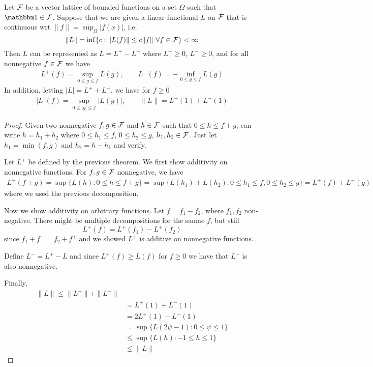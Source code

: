 \begin{theorem}
  Let $\mathcal{F}$ be a vector lattice of bounded functions on a set $\Omega$
  such that $\ind \in \cF$.
  Suppose that we are given a linear functional $L$ on $\mathcal{F}$ that is continuous
  wrt $\|f\| = \sup_{\Omega} \lvert f(x) \rvert$, i.e.
  \[
    \|L\| = \inf \{ c : \|L(f)\| \leq c \|f\|~\forall f \in \mathcal{F} \} < \infty
  \]
  Then $L$ can be represented as $L = L^+ - L^-$ where
  $L^+ \geq 0$, $L^- \geq 0$, and for all nonnegative $f \in \mathcal{F}$ we have
  \begin{align*}
    L^+(f) = \sup_{0 \leq g \leq f} L(g),\qquad
    L^-(f) = -\inf_{0 \leq g \leq f} L(g)
  \end{align*}
  In addition, letting $\lvert L \rvert = L^+ + L^-$, we have for $f \geq 0$
  \begin{align*}
    \lvert L \rvert(f) = \sup_{0 \leq \lvert g \rvert \leq f} \lvert L (g) \rvert,
    \qquad \|L\| = L^+(1) + L^-(1)
  \end{align*}
\end{theorem}

\begin{proof}
  Given two nonnegative $f,g \in \mathcal{F}$ and $h \in \mathcal{F}$ such that
  $0 \leq h \leq f + g$, can write $h = h_1 + h_2$ where
  $0 \leq h_1 \leq f$, $0 \leq h_2 \leq g$, $h_1, h_2 \in \mathcal{F}$.
  Just let $h_1 = \min(f,g)$ and $h_2 = h - h_1$ and verify.

  Let $L^+$ be defined by the previous theorem. We first
  show additivity on nonnegative functions.
  For $f,g \in \mathcal{F}$ nonnegative, we have
  \begin{align*}
    L^+(f+g) = \sup \{L(h) : 0 \leq h \leq f + g\}
    = \sup\{ L(h_1) + L(h_2) : 0 \leq h_1 \leq f, 0 \leq h_2 \leq g\}
    = L^+(f) + L^+(g)
  \end{align*}
  where we used the previous decomposition.

  Now we show additivity on arbitrary functions.
  Let $f = f_1 - f_2$, where $f_1, f_2$ non-negative. There might be
  multiple decompositions for the samae $f$, but still
  \[
    L^+(f) = L^+(f_1) - L^+(f_2)
  \]
  since $f_1 + f^- = f_2 + f^+$ and we showed $L^+$ is additive on nonnegative
  functions.

  Define $L^- =  L^+ - L$ and since $L^+(f) \geq L(f)$ for $f \geq 0$
  we have that $L^-$ is also nonnegative.

  Finally,
  \begin{align*}
    \|L\| \leq \|L^+\| + \|L^-\| \\
    &= L^+(1) + L^-(1) \\
    &= 2L^+(1) - L^-(1) \\
    &= \sup\{L(2\psi-1) : 0 \leq \psi \leq 1 \} \\
    &\leq \sup \{ L(h) : -1 \leq h \leq 1 \} \\
    &\leq \|L\|
  \end{align*}
\end{proof}

